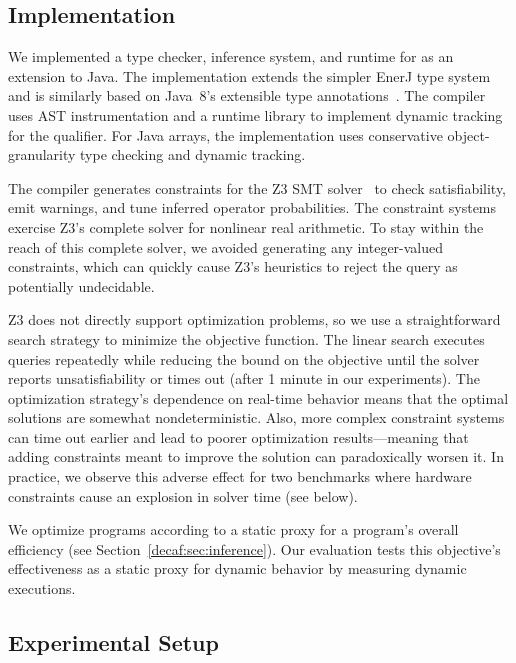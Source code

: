 \subsection{Implementation}

We implemented a type checker, inference system, and runtime for \lang as an
extension to Java.
The implementation extends the simpler EnerJ type system~\cite{enerj} and is
similarly based on Java~8's extensible type annotations~\cite{jsr308}.
The compiler uses AST instrumentation and a runtime library to implement
dynamic tracking for the \Dyn qualifier.
For Java arrays, the implementation uses conservative object-granularity type
checking and dynamic tracking.

The compiler generates constraints for the Z3 SMT solver~\cite{z3} to check
satisfiability, emit warnings, and tune inferred operator probabilities.
The constraint systems exercise Z3's complete
solver for nonlinear real arithmetic.
To stay within the reach of this complete solver, we avoided generating any
integer-valued constraints, which can quickly cause Z3's heuristics to reject
the query as potentially undecidable.

Z3 does not directly support optimization problems, so
we use a straightforward search strategy to
minimize the objective function.
The linear search executes queries repeatedly while reducing the bound on the
objective until the solver reports unsatisfiability or times out (after 1
minute in our experiments).
The optimization strategy's dependence on real-time behavior means that the
optimal solutions are somewhat nondeterministic.
Also, more complex constraint systems can time out earlier and lead to
poorer optimization results---meaning that adding constraints meant
to improve the solution can paradoxically worsen it.
In practice, we observe this adverse effect for two benchmarks where hardware
constraints cause an explosion in solver time (see below).

We optimize programs according to a static proxy for a program's overall
efficiency (see Section~\ref{decaf:sec:inference}).
Our evaluation tests this objective's effectiveness as a static proxy for
dynamic behavior by measuring dynamic executions.

\subsection{Experimental Setup}

